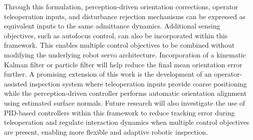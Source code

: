 \documentclass[journal]{IEEEtran}
\begin{document}
Through this formulation, perception-driven orientation corrections, operator teleoperation inputs, and disturbance rejection mechanisms can be expressed as equivalent inputs to the same admittance dynamics. Additional sensing objectives, such as autofocus control, can also be incorporated within this framework. This enables multiple control objectives to be combined without modifying the underlying robot servo architecture.
Incorporation of a kinematic Kalman filter or particle filter will help reduce the final mean orientation error further.
A promising extension of this work is the development of an operator-assisted inspection system where teleoperation inputs provide coarse positioning while the perception-driven controller performs automatic orientation alignment using estimated surface normals. Future research will also investigate the use of PID-based controllers within this framework to reduce tracking error during teleoperation and regulate interaction dynamics when multiple control objectives are present, enabling more flexible and adaptive robotic inspection.


%
%

\end{document}
